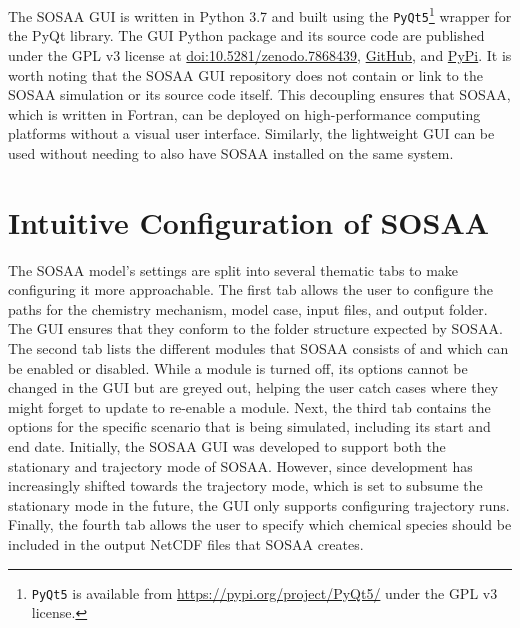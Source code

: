 The SOSAA GUI is written in Python 3.7 \cite{python-3.7} and built using the \texttt{PyQt5}\footnote{\texttt{PyQt5} is available from \href{https://pypi.org/project/PyQt5/}{https://pypi.org/project/PyQt5/} under the GPL v3 license.} wrapper for the PyQt library. The GUI Python package and its source code are published under the GPL v3 license at \href{https://doi.org/10.5281/zenodo.7868439}{doi:10.5281/zenodo.7868439}, \href{https://github.com/juntyr/sosaa-gui}{GitHub}, and \href{https://pypi.org/project/sosaa-gui}{PyPi}. It is worth noting that the SOSAA GUI repository does not contain or link to the SOSAA simulation or its source code itself. This decoupling ensures that SOSAA, which is written in Fortran, can be deployed on high-performance computing platforms without a visual user interface. Similarly, the lightweight GUI can be used without needing to also have SOSAA installed on the same system.

\section{Intuitive Configuration of SOSAA} \label{txt:sosaa-gui-config}

The SOSAA model's settings are split into several thematic tabs to make configuring it more approachable. The first tab allows the user to configure the paths for the chemistry mechanism, model case, input files, and output folder. The GUI ensures that they conform to the folder structure expected by SOSAA. The second tab lists the different modules that SOSAA consists of and which can be enabled or disabled. While a module is turned off, its options cannot be changed in the GUI but are greyed out, helping the user catch cases where they might forget to update to re-enable a module. Next, the third tab contains the options for the specific scenario that is being simulated, including its start and end date. Initially, the SOSAA GUI was developed to support both the stationary and trajectory mode of SOSAA. However, since development has increasingly shifted towards the trajectory mode, which is set to subsume the stationary mode in the future, the GUI only supports configuring trajectory runs. Finally, the fourth tab allows the user to specify which chemical species should be included in the output NetCDF files that SOSAA creates.

